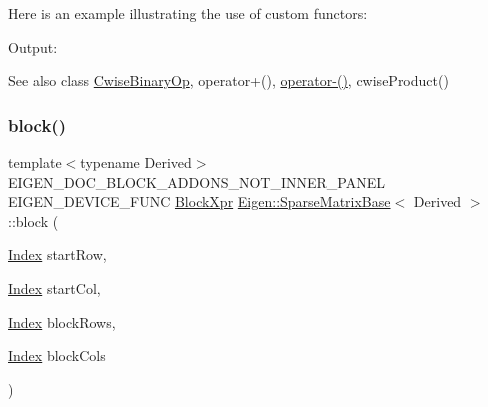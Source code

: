 Here is an example illustrating the use of custom functors\+: 
\begin{DoxyCodeInclude}{0}
\end{DoxyCodeInclude}
 Output\+: 
\begin{DoxyVerbInclude}
\end{DoxyVerbInclude}


\begin{DoxySeeAlso}{See also}
class \mbox{\hyperlink{class_eigen_1_1_cwise_binary_op}{Cwise\+Binary\+Op}}, operator+(), \mbox{\hyperlink{class_eigen_1_1_sparse_matrix_base_ad0d7bb4733595293b54fc8b11c9f90bd}{operator-\/()}}, cwise\+Product() 
\end{DoxySeeAlso}
\mbox{\label{class_eigen_1_1_sparse_matrix_base_a7c28a2f511181c727396d5e813519d38}} 
\subsubsection{\texorpdfstring{block()}{block()}\hspace{0.1cm}{\footnotesize\ttfamily [1/3]}}
{\footnotesize\ttfamily template$<$typename Derived$>$ \\
E\+I\+G\+E\+N\+\_\+\+D\+O\+C\+\_\+\+B\+L\+O\+C\+K\+\_\+\+A\+D\+D\+O\+N\+S\+\_\+\+N\+O\+T\+\_\+\+I\+N\+N\+E\+R\+\_\+\+P\+A\+N\+EL E\+I\+G\+E\+N\+\_\+\+D\+E\+V\+I\+C\+E\+\_\+\+F\+U\+NC \mbox{\hyperlink{class_eigen_1_1_block}{Block\+Xpr}} \mbox{\hyperlink{class_eigen_1_1_sparse_matrix_base}{Eigen\+::\+Sparse\+Matrix\+Base}}$<$ Derived $>$\+::block (\begin{DoxyParamCaption}\item[{\mbox{\hyperlink{struct_eigen_1_1_eigen_base_a554f30542cc2316add4b1ea0a492ff02}{Index}}}]{start\+Row,  }\item[{\mbox{\hyperlink{struct_eigen_1_1_eigen_base_a554f30542cc2316add4b1ea0a492ff02}{Index}}}]{start\+Col,  }\item[{\mbox{\hyperlink{struct_eigen_1_1_eigen_base_a554f30542cc2316add4b1ea0a492ff02}{Index}}}]{block\+Rows,  }\item[{\mbox{\hyperlink{struct_eigen_1_1_eigen_base_a554f30542cc2316add4b1ea0a492ff02}{Index}}}]{block\+Cols }\end{DoxyParamCaption})\hspace{0.3cm}{\ttfamily [inline]}}

